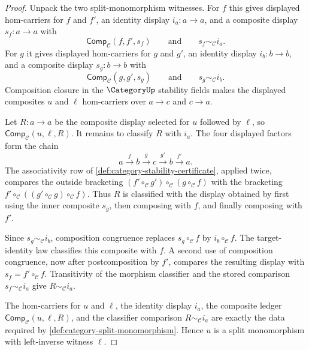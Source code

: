 \begin{proof}
Unpack the two split-monomorphism witnesses. For $f$ this gives displayed
hom-carriers for $f$ and $f'$, an identity display $i_a:a\to a$, and a
composite display $s_f:a\to a$ with
$$
\mathsf{Comp}_{\mathcal C}(f,f',s_f)
\qquad\text{and}\qquad
s_f\sim_{\mathcal C} i_a.
$$
For $g$ it gives displayed hom-carriers for $g$ and $g'$, an identity display
$i_b:b\to b$, and a composite display $s_g:b\to b$ with
$$
\mathsf{Comp}_{\mathcal C}(g,g',s_g)
\qquad\text{and}\qquad
s_g\sim_{\mathcal C} i_b.
$$
Composition closure in the $\CategoryUp$ stability fields makes the displayed
composites $u$ and $\ell$ hom-carriers over $a\to c$ and $c\to a$.

Let $R:a\to a$ be the composite display selected for $u$ followed by $\ell$,
so $\mathsf{Comp}_{\mathcal C}(u,\ell,R)$. It remains to classify $R$ with
$i_a$. The four displayed factors form the chain
$$
a\xrightarrow{f}b\xrightarrow{g}c\xrightarrow{g'}b\xrightarrow{f'}a.
$$
The associativity row of \autoref{def:category-stability-certificate}, applied
twice, compares the outside bracketing
$(f'\circ_{\mathcal C}g')\circ_{\mathcal C}(g\circ_{\mathcal C}f)$ with the
bracketing $f'\circ_{\mathcal C}((g'\circ_{\mathcal C}g)\circ_{\mathcal C}f)$.
Thus $R$ is classified with the display obtained by first using the inner
composite $s_g$, then composing with $f$, and finally composing with $f'$.

Since $s_g\sim_{\mathcal C}i_b$, composition congruence replaces
$s_g\circ_{\mathcal C}f$ by $i_b\circ_{\mathcal C}f$. The target-identity law
classifies this composite with $f$. A second use of composition congruence,
now after postcomposition by $f'$, compares the resulting display with
$s_f=f'\circ_{\mathcal C}f$. Transitivity of the morphism classifier and the
stored comparison $s_f\sim_{\mathcal C}i_a$ give
$R\sim_{\mathcal C}i_a$.

The hom-carriers for $u$ and $\ell$, the identity display $i_a$, the composite
ledger $\mathsf{Comp}_{\mathcal C}(u,\ell,R)$, and the classifier comparison
$R\sim_{\mathcal C}i_a$ are exactly the data required by
\autoref{def:category-split-monomorphism}. Hence $u$ is a split monomorphism
with left-inverse witness $\ell$.
\end{proof}
